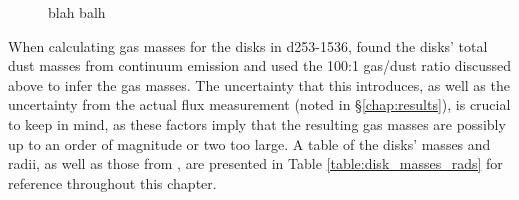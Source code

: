 \begin{figure}[ht]
  \hspace*{\fill}%
  \vfill%
  \hspace*{\fill}%
  \caption{blah balh}
  \label{fig:GDRs}
\end{figure}


When calculating gas masses for the disks in d253-1536, \cite{Williams2014} found the disks' total dust masses from continuum emission and used the 100:1 gas/dust ratio discussed above to infer the gas masses. The uncertainty that this introduces, as well as the uncertainty from the actual flux measurement (noted in \S\ref{chap:results}), is crucial to keep in mind, as these factors imply that the resulting gas masses are possibly up to an order of magnitude or two too large. A table of the disks' masses and radii, as well as those from \citet{Factor2017}, are presented in Table \ref{table:disk_masses_rads} for reference throughout this chapter.


